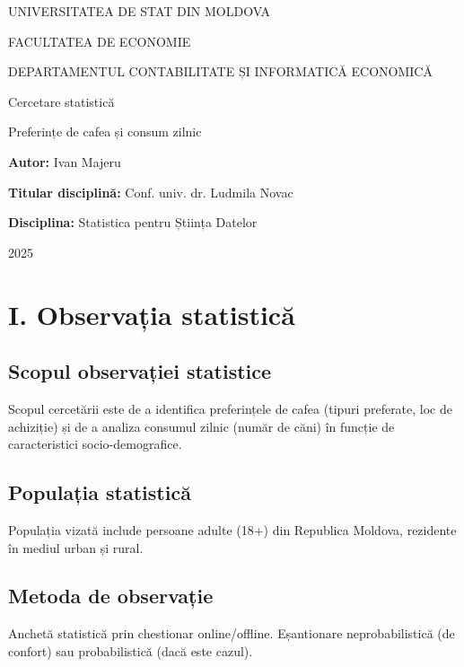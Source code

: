\documentclass[12pt,a4paper]{report}
\newcommand{\Universitate}{UNIVERSITATEA DE STAT DIN MOLDOVA}
\newcommand{\Facultate}{FACULTATEA DE ECONOMIE}
\newcommand{\Departament}{DEPARTAMENTUL CONTABILITATE ȘI INFORMATICĂ ECONOMICĂ}
\newcommand{\TitluProiect}{Preferințe de cafea și consum zilnic}
\newcommand{\Disciplina}{Statistica pentru Știința Datelor}
\newcommand{\Autor}{Ivan Majeru}
\newcommand{\Titular}{Conf. univ. dr. Ludmila Novac}
\newcommand{\An}{2025}
\begin{document}
\begin{titlepage}
  \centering
  {\Large \Universitate\par}
  {\large \Facultate\par}
  {\large \Departament\par}
  \vspace{2cm}
  {\LARGE Cercetare statistică\par}
  \vspace{0.5cm}
  {\Large \TitluProiect\par}
  \vspace{2.5cm}
  \begin{flushleft}
    \textbf{Autor:} \Autor\par
    \textbf{Titular disciplină:} \Titular\par
    \textbf{Disciplina:} \Disciplina\par
  \end{flushleft}
  \vfill
  {\An\par}
\end{titlepage}

\tableofcontents
\listoffigures
\listoftables
\clearpage
{}

\section*{I. Observația statistică}
\setcounter{section}{1}

\subsection{Scopul observației statistice}
Scopul cercetării este de a identifica preferințele de cafea (tipuri preferate, loc de achiziție) și de a analiza consumul zilnic (număr de căni) în funcție de caracteristici socio-demografice.

\subsection{Populația statistică}
Populația vizată include persoane adulte (18+) din Republica Moldova, rezidente în mediul urban și rural.

\subsection{Metoda de observație}
Anchetă statistică prin chestionar online/offline. Eșantionare neprobabilistică (de confort) sau probabilistică (dacă este cazul).
\end{document}
